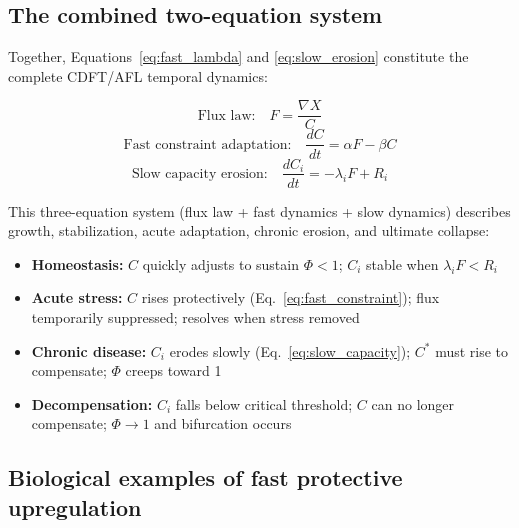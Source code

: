 \documentclass[11pt]{article}
\begin{document}
\subsection{The combined two-equation system}

Together, Equations~\eqref{eq:fast_lambda} and \eqref{eq:slow_erosion} constitute the complete CDFT/AFL temporal dynamics:

\begin{equation}
\text{Flux law:} \quad F = \frac{\nabla X}{C}
\label{eq:flux_law}
\end{equation}
\begin{equation}
\text{Fast constraint adaptation:} \quad \frac{dC}{dt} = \alpha F - \beta C
\label{eq:fast_constraint}
\end{equation}
\begin{equation}
\text{Slow capacity erosion:} \quad \frac{dC_i}{dt} = -\lambda_i F + R_i
\label{eq:slow_capacity}
\end{equation}

This three-equation system (flux law + fast dynamics + slow dynamics) describes growth, stabilization, acute adaptation, chronic erosion, and ultimate collapse:
\begin{itemize}[leftmargin=1.5em,itemsep=3pt]
\item \textbf{Homeostasis:} $C$ quickly adjusts to sustain $\Phi < 1$; $C_i$ stable when $\lambda_i F < R_i$
\item \textbf{Acute stress:} $C$ rises protectively (Eq.~\ref{eq:fast_constraint}); flux temporarily suppressed; resolves when stress removed
\item \textbf{Chronic disease:} $C_i$ erodes slowly (Eq.~\ref{eq:slow_capacity}); $C^*$ must rise to compensate; $\Phi$ creeps toward 1
\item \textbf{Decompensation:} $C_i$ falls below critical threshold; $C$ can no longer compensate; $\Phi \to 1$ and bifurcation occurs
\end{itemize}

\subsection{Biological examples of fast protective upregulation}
\end{document}
